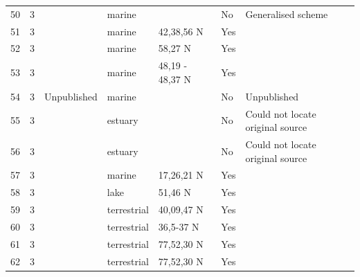 \documentclass[12pt]{article}
\begin{document}
\begin{landscape}
\begin{table}[h!]
{\begin{tabular}{p{2.8cm}p{1.3cm}p{5.5cm}p{2.2cm}p{2.5cm}lp{3.5cm}}
        50    & 3 & \cite{Nybakken1982}    & marine &       & No    & Generalised scheme \\
        51    & 3 & \cite{Dexter1947}    & marine & 42,38,56 N & Yes   &       \\
        52    & 3 & \cite{Paine1980a}    & marine & 58,27 N & Yes   &       \\
        53    & 3 & \cite{Paine1980a}    & marine & 48,19 - 48,37 N & Yes   &       \\
        54    & 3 & Unpublished  & marine &       & No    & Unpublished \\
        55    & 3 & \cite{Milne1972}  & estuary &       & No    & Could not locate original source \\
        56    & 3 & \cite{Milne1972}  & estuary &       & No    & Could not locate original source \\
        57    & 3 & \cite{Yanez1978}  & marine & 17,26,21 N & Yes   &       \\
        58    & 3 & \cite{Cohen1990}  & lake & 51,46 N & Yes   &       \\
        59    & 3 & \cite{Twomey1945}    & terrestrial & 40,09,47 N & Yes   &       \\
        60    & 3 & \cite{Rasmussen1941}    & terrestrial & 36,5-37 N & Yes   &       \\
        61    & 3 & \cite{Summerhayes1928}  & terrestrial & 77,52,30 N & Yes   &       \\
        62    & 3 & \cite{Summerhayes1928}  & terrestrial & 77,52,30 N & Yes   &       \\
        \hline
      \end{tabular}}%
      \end{table}

        \newpage


\end{landscape}
\end{document}
